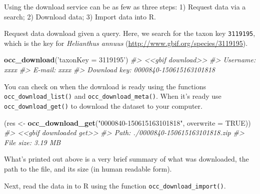 \documentclass[author-year, review, 11pt]{components/elsarticle} %
\newenvironment{Shaded}{\begin{snugshade}}{\end{snugshade}}
\newcommand{\KeywordTok}[1]{\textcolor[rgb]{0.13,0.29,0.53}{\textbf{{#1}}}}
\newcommand{\DataTypeTok}[1]{\textcolor[rgb]{0.13,0.29,0.53}{{#1}}}
\newcommand{\StringTok}[1]{\textcolor[rgb]{0.31,0.60,0.02}{{#1}}}
\newcommand{\CommentTok}[1]{\textcolor[rgb]{0.56,0.35,0.01}{\textit{{#1}}}}
\newcommand{\OtherTok}[1]{\textcolor[rgb]{0.56,0.35,0.01}{{#1}}}
\newcommand{\NormalTok}[1]{{#1}}
\begin{document}
Using the download service can be as few as three steps: 1) Request data
via a search; 2) Download data; 3) Import data into R.

Request data download given a query. Here, we search for the taxon key
\texttt{3119195}, which is the key for \emph{Helianthus annuus}
(\url{http://www.gbif.org/species/3119195}).

\begin{Shaded}
\begin{Highlighting}[]
\KeywordTok{occ_download}\NormalTok{(}\StringTok{'taxonKey = 3119195'}\NormalTok{)}
\CommentTok{#> <<gbif download>>}
\CommentTok{#>   Username: xxxx}
\CommentTok{#>   E-mail: xxxx}
\CommentTok{#>   Download key: 0000840-150615163101818}
\end{Highlighting}
\end{Shaded}

You can check on when the download is ready using the functions
\texttt{occ\_download\_list()} and \texttt{occ\_download\_meta()}. When
it's ready use \texttt{occ\_download\_get()} to download the dataset to
your computer.

\begin{Shaded}
\begin{Highlighting}[]
\NormalTok{(res <-}\StringTok{ }\KeywordTok{occ_download_get}\NormalTok{(}\StringTok{"0000840-150615163101818"}\NormalTok{, }\DataTypeTok{overwrite =} \OtherTok{TRUE}\NormalTok{))}
\CommentTok{#> <<gbif downloaded get>>}
\CommentTok{#>   Path: ./0000840-150615163101818.zip}
\CommentTok{#>   File size: 3.19 MB}
\end{Highlighting}
\end{Shaded}

What's printed out above is a very brief summary of what was downloaded,
the path to the file, and its size (in human readable form).

Next, read the data in to R using the function
\texttt{occ\_download\_import()}.

\begin{Shaded}
\end{Shaded}
\end{document}
